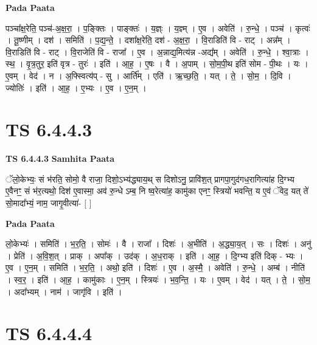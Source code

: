 \documentclass[17pt]{extarticle}
\begin{document}
\textbf{Pada Paata} \newline

पञ्चा᳚क्ष॒रेति॒ पञ्च॑-अ॒क्ष॒रा॒ । प॒ङ्क्तिः । पाङ्क्तः॑ । य॒ज्ञ्ः । य॒ज्ञ्म् । ए॒व । अवेति॑ । रु॒न्धे॒ । पञ्च॑ । कृत्वः॑ । तू॒ष्णीम् । दश॑ । समिति॑ । प॒द्य॒न्ते॒ । दशा᳚क्ष॒रेति॒ दश॑ - अ॒क्ष॒रा॒ । वि॒राडिति॑ वि - राट् । अन्न᳚म् । वि॒राडिति॑ वि - राट् । वि॒राजेति॑ वि - राजा᳚ । ए॒व । अ॒न्नाद्य॒मित्य॑न्न -अद्य᳚म् । अवेति॑ । रु॒न्धे॒ । श्वा॒त्राः । स्थ॒ । वृ॒त्र॒तुर॒ इति॑ वृत्र - तुरः॑ । इति॑ । आ॒ह॒ । ए॒षः । वै । अ॒पाम् । सो॒म॒पी॒थ इति॑ सोम - पी॒थः । यः । ए॒वम् । वेद॑ । न । अ॒फ्स्वित्य॑प् - सु । आर्ति᳚म् । एति॑ । ऋ॒च्छ॒ति॒ । यत् । ते॒ । सो॒म॒ । दि॒वि । ज्योतिः॑ । इति॑ । आ॒ह॒ । ए॒भ्यः । ए॒व । ए॒न॒म् ।  \newline




\section*{ TS 6.4.4.3 }

\textbf{TS 6.4.4.3 } \newline
\textbf{Samhita Paata} \newline

ॅलो॒केभ्यः॒ सं भ॑रति॒ सोमो॒ वै राजा॒ दिशो॒ऽभ्य॑द्ध्याय॒थ् स दिशोऽनु॒ प्रावि॑श॒त् प्रागपा॒गुद॑गध॒रागित्या॑ह दि॒ग्भ्य ए॒वैनꣳ॒॒ सं भ॑र॒त्यथो॒ दिश॑ ए॒वास्मा॒ अव॑ रु॒न्धे ऽम्ब॒ नि ष्व॒रेत्या॑ह॒ कामु॑का एनꣳ॒॒ स्त्रियो॑ भवन्ति॒ य ए॒वं ॅवेद॒ यत् ते॑ सो॒मादा᳚भ्यं॒ नाम॒ जागृ॒वीत्या॑- [  ] \newline

\textbf{Pada Paata} \newline

लो॒केभ्यः॑ । समिति॑ । भ॒र॒ति॒ । सोमः॑ । वै । राजा᳚ । दिशः॑ । अ॒भीति॑ । अ॒द्ध्या॒य॒त् । सः । दिशः॑ । अनु॑ । प्रेति॑ । अ॒वि॒श॒त् । प्राक् । अपा᳚क् । उद॑क् । अ॒ध॒राक् । इति॑ । आ॒ह॒ । दि॒ग्भ्य इति॑ दिक् - भ्यः । ए॒व । ए॒न॒म् । समिति॑ । भ॒र॒ति॒ । अथो॒ इति॑ । दिशः॑ । ए॒व । अ॒स्मै॒ । अवेति॑ । रु॒न्धे॒ । अम्ब॑ । नीति॑ । स्व॒र॒ । इति॑ । आ॒ह॒ । कामु॑काः । ए॒न॒म् । स्त्रियः॑ । भ॒व॒न्ति॒ । यः । ए॒वम् । वेद॑ । यत् । ते॒ । सो॒म॒ । अदा᳚भ्यम् । नाम॑ । जागृ॑वि । इति॑ ।  \newline




\section*{ TS 6.4.4.4 }
\end{document}

